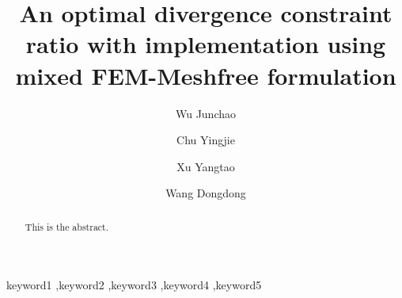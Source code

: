 \begin{frontmatter}

\title{An optimal divergence constraint ratio with implementation using mixed FEM-Meshfree formulation}

\author[1]{Wu Junchao}
\author[2]{Chu Yingjie}
\author[1]{Xu Yangtao}
\author[2]{Wang Dongdong}



\begin{abstract}
    This is the abstract.
\end{abstract}

\begin{keyword}
    keyword1 \sep keyword2 \sep keyword3 \sep keyword4 \sep keyword5
\end{keyword}

\end{frontmatter}

